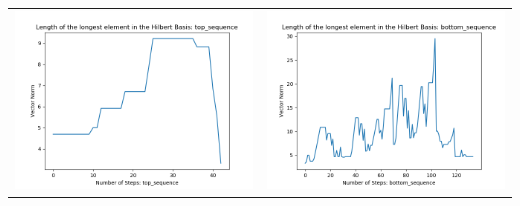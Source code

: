 \documentclass[10pt]{article}
\begin{document}
\begin{tabular}{c|c}
\begin{minipage}{.4\textwidth}
\includegraphics[width=\textwidth]{"DATA/4d/5 generators 2 bound G/top_sequence LENGTH"}
\end{minipage} &
\begin{minipage}{.4\textwidth}
\includegraphics[width=\textwidth]{"DATA/4d/5 generators 2 bound G bottomup/bottom_sequence LENGTH"}
\end{minipage}
\end{tabular}
\end{document}
